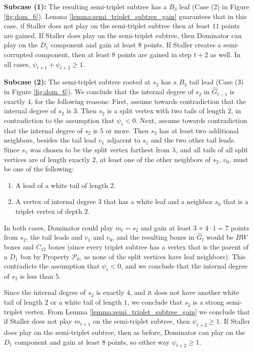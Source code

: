 \documentclass[11pt]{article}
\def\dnsitem{\vspace{-7pt}\item}
\theoremstyle{definition}
\def\propt1{\mathcal{P}_0}
\begin{document}
\smallskip
\par\noindent
{\bf Subcase (1):}
The resulting semi-triplet subtree has a $B_3$ leaf (Case (2) in Figure \ref{fig:dom_6}).
Lemma \ref{lemma:semi_triplet_subtree_gain} guarantees that in this case, if Staller does not play on the semi-triplet subtree then at least $11$ points are gained.
If Staller does play on the semi-triplet subtree, then Dominator can play on the $D_1$ component and gain at least $8$ points.
If Staller creates a semi-corrupted component, then at least $8$ points are gained in step $t+2$ as well.
In all cases, ${\psi_{t+1} + \psi_{t+2} \geq 1}$.

\smallskip
\par\noindent
{\bf Subcase (2):}
The semi-triplet subtree rooted at $s_2$ has a $B_3$ tail lead (Case (3) in Figure \ref{fig:dom_6}).
We conclude that the internal degree of $s_2$ in $\hat{G}_{t-1}$ is exactly $4$, for the following reasons:
First, assume towards contradiction that the internal degree of $s_2$ is $3$. Then $s_2$ is a split vertex with two tails of length $2$, in contradiction to the assumption that $\psi_t < 0$.
Next, assume towards contradiction that the internal degree of $s_2$ is $5$ or more.
Then $s_2$ has at least two additional neighbors, besides the tail lead $v_1$ adjacent to $s_1$ and the two other tail leads.
Since $s_1$ was chosen to be the split vertex farthest from $\lambda$, and all tails of all split vertices are of length exactly $2$, at least one of the other neighbors of $s_2$, $v_0$, must be one of the following:
\begin{enumerate}
	\dnsitem A lead of a white tail of length $2$. 
	\dnsitem A vertex of internal degree $3$ that has a white leaf and a neighbor $s_0$ that is a triplet vertex of depth $2$.
\end{enumerate}
In both cases, Dominator could play $m_t = s_2$ and gain at least $3 + 4 \cdot 1 = 7$ points from $s_2$, the tail leads and $v_1$ and $v_0$, 
and the resulting boxes in $\hat{G}_t$ would be $BW$ boxes and $C_{12}$ boxes (since every triplet subtree has a vertex that is the parent of a $D_1$ box by Property $\propt1$, as none of the split vertices have leaf neighbors).
This contradicts the assumption that $\psi_t < 0$, and we conclude that the internal degree of $s_2$ is less than $5$.

Since the internal degree of $s_2$ is exactly $4$, and it does not have another white tail of length $2$ 
or a white tail of length $1$, 
we conclude that
$s_2$ is a strong semi-triplet vertex. From Lemma \ref{lemma:semi_triplet_subtree_gain} we conclude that if Staller does not play $m_{t+1}$ on the semi-triplet subtree, then $\psi_{t+2} \geq 1$.
If Staller does play on the semi-triplet subtree, then as before, Dominator can play on the $D_1$ component and gain at least $8$ points, so either way $\psi_{t+2} \geq 1$.
\end{document}
